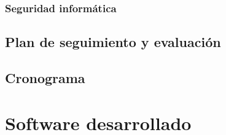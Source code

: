 \documentclass{report}
\begin{document}
\subsection{Seguridad informática}

\section{Plan de seguimiento y evaluación}

\section{Cronograma}

\appendix

\chapter{Software desarrollado}



\printbibliography
\end{document}
